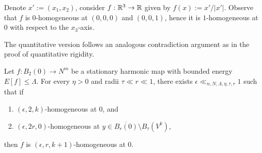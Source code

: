 \begin{example}
	Denote $x' := (x_1, x_2)$, consider $f: \mathbb R^3 \to \mathbb R$ given by $f (x) := x'/|x'|$. Observe that $f$ is $0$-homogeneous at $(0, 0, 0)$ and $(0, 0, 1)$, hence it is $1$-homogeneous at $0$ with respect to the $x_3$-axis.
\end{example}

The quantitative version follows an analogous contradiction argument as in the proof of quantitative rigidity.

\begin{lemma}
	Let $f: B_2 (0) \to N^m$ be a stationary harmonic map with bounded energy $E[f] \leq \Lambda$. For every $\eta > 0$ and radii $\tau \ll r \ll 1$, there exists $\epsilon \ll_{n, N, \Lambda, \eta, \tau, r} 1$ such that if 
	\begin{enumerate}
		\item $(\epsilon, 2, k)$-homogeneous at $0$, and
		\item $(\epsilon, 2r, 0)$-homogeneous at $y \in \overline{B_r (0)} \setminus B_\tau (V^k)$,
	\end{enumerate}
	then $f$ is $(\epsilon, r, k + 1)$-homogeneous at $0$. \label{lem:cone}
\end{lemma}

